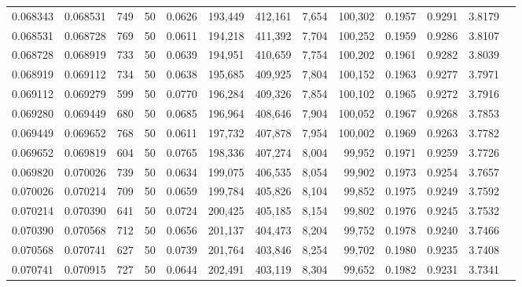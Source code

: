 \begin{tabular}{rrrrrrrrrrrrr}
0.068343 & 0.068531 &   749 &  50 &                                     0.0626 & 193,449 & 412,161 &   7,654 & 100,302 & 0.1957 & 0.9291 & 3.8179 \\
0.068531 & 0.068728 &   769 &  50 &                                     0.0611 & 194,218 & 411,392 &   7,704 & 100,252 & 0.1959 & 0.9286 & 3.8107 \\
0.068728 & 0.068919 &   733 &  50 &                                     0.0639 & 194,951 & 410,659 &   7,754 & 100,202 & 0.1961 & 0.9282 & 3.8039 \\
0.068919 & 0.069112 &   734 &  50 &                                     0.0638 & 195,685 & 409,925 &   7,804 & 100,152 & 0.1963 & 0.9277 & 3.7971 \\
0.069112 & 0.069279 &   599 &  50 &                                     0.0770 & 196,284 & 409,326 &   7,854 & 100,102 & 0.1965 & 0.9272 & 3.7916 \\
0.069280 & 0.069449 &   680 &  50 &                                     0.0685 & 196,964 & 408,646 &   7,904 & 100,052 & 0.1967 & 0.9268 & 3.7853 \\
0.069449 & 0.069652 &   768 &  50 &                                     0.0611 & 197,732 & 407,878 &   7,954 & 100,002 & 0.1969 & 0.9263 & 3.7782 \\
0.069652 & 0.069819 &   604 &  50 &                                     0.0765 & 198,336 & 407,274 &   8,004 &  99,952 & 0.1971 & 0.9259 & 3.7726 \\
0.069820 & 0.070026 &   739 &  50 &                                     0.0634 & 199,075 & 406,535 &   8,054 &  99,902 & 0.1973 & 0.9254 & 3.7657 \\
0.070026 & 0.070214 &   709 &  50 &                                     0.0659 & 199,784 & 405,826 &   8,104 &  99,852 & 0.1975 & 0.9249 & 3.7592 \\
0.070214 & 0.070390 &   641 &  50 &                                     0.0724 & 200,425 & 405,185 &   8,154 &  99,802 & 0.1976 & 0.9245 & 3.7532 \\
0.070390 & 0.070568 &   712 &  50 &                                     0.0656 & 201,137 & 404,473 &   8,204 &  99,752 & 0.1978 & 0.9240 & 3.7466 \\
0.070568 & 0.070741 &   627 &  50 &                                     0.0739 & 201,764 & 403,846 &   8,254 &  99,702 & 0.1980 & 0.9235 & 3.7408 \\
0.070741 & 0.070915 &   727 &  50 &                                     0.0644 & 202,491 & 403,119 &   8,304 &  99,652 & 0.1982 & 0.9231 & 3.7341 \\

\end{tabular}
